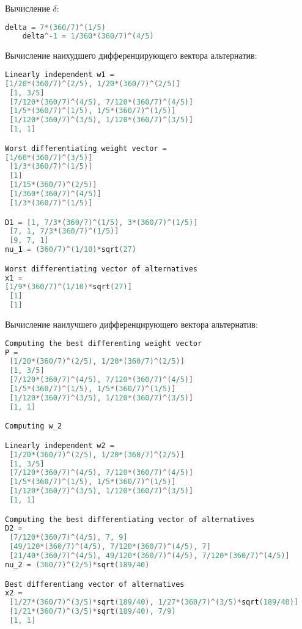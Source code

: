 \documentclass[specialist,
	substylefile = spbu_report.rtx,
	subf,href,colorlinks=true, 12pt]{disser}
\begin{document}
Вычисление $\delta$:
\begin{lstlisting}[language=c++,basicstyle=\footnotesize\ttfamily]
	delta = 7*(360/7)^(1/5)
	delta^-1 = 1/360*(360/7)^(4/5)
\end{lstlisting}
Вычисление наихудшего дифференцирующего вектора альтернатив:
\begin{lstlisting}[language=c++,basicstyle=\scriptsize\ttfamily]
Linearly independent w1 =
[1/20*(360/7)^(2/5), 1/20*(360/7)^(2/5)]
 [1, 3/5]
 [7/120*(360/7)^(4/5), 7/120*(360/7)^(4/5)]
 [1/5*(360/7)^(1/5), 1/5*(360/7)^(1/5)]
 [1/120*(360/7)^(3/5), 1/120*(360/7)^(3/5)]
 [1, 1]

Worst differentiating weight vector =
[1/60*(360/7)^(3/5)]
 [1/3*(360/7)^(1/5)]
 [1]
 [1/15*(360/7)^(2/5)]
 [1/360*(360/7)^(4/5)]
 [1/3*(360/7)^(1/5)]

D1 = [1, 7/3*(360/7)^(1/5), 3*(360/7)^(1/5)]
 [7, 1, 7/3*(360/7)^(1/5)]
 [9, 7, 1]
nu_1 = (360/7)^(1/10)*sqrt(27)

Worst differentiating vector of alternatives
x1 =
[1/9*(360/7)^(1/10)*sqrt(27)]
 [1]
 [1]
\end{lstlisting}
Вычисление наилучшего дифференцирующего вектора альтернатив:
\begin{lstlisting}[language=c++,basicstyle=\footnotesize\ttfamily]
Computing the best differenting weight vector
P =
 [1/20*(360/7)^(2/5), 1/20*(360/7)^(2/5)]
 [1, 3/5]
 [7/120*(360/7)^(4/5), 7/120*(360/7)^(4/5)]
 [1/5*(360/7)^(1/5), 1/5*(360/7)^(1/5)]
 [1/120*(360/7)^(3/5), 1/120*(360/7)^(3/5)]
 [1, 1]

Computing w_2

Linearly independent w2 =
 [1/20*(360/7)^(2/5), 1/20*(360/7)^(2/5)]
 [1, 3/5]
 [7/120*(360/7)^(4/5), 7/120*(360/7)^(4/5)]
 [1/5*(360/7)^(1/5), 1/5*(360/7)^(1/5)]
 [1/120*(360/7)^(3/5), 1/120*(360/7)^(3/5)]
 [1, 1]

Computing the best differentiating vector of alternatives
D2 =
 [7/120*(360/7)^(4/5), 7, 9]
 [49/120*(360/7)^(4/5), 7/120*(360/7)^(4/5), 7]
 [21/40*(360/7)^(4/5), 49/120*(360/7)^(4/5), 7/120*(360/7)^(4/5)]
nu_2 = (360/7)^(2/5)*sqrt(189/40)

Best differentiang vector of alternatives
x2 =
 [1/27*(360/7)^(3/5)*sqrt(189/40), 1/27*(360/7)^(3/5)*sqrt(189/40)]
 [1/21*(360/7)^(3/5)*sqrt(189/40), 7/9]
 [1, 1]
\end{lstlisting}
\end{document}
